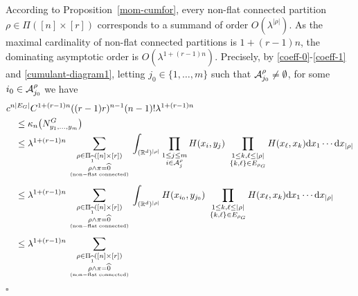 \documentclass[12pt]{article}
\newcommand{\R}{\mathbb{R}}
\newenvironment{Proof}{\removelastskip\par\medskip
\noindent{\em Proof.} \rm}{\penalty-20\null\hfill$\square$\par\medbreak}
\numberwithin{equation}{section}
\begin{document}
\begin{Proof}
 According to Proposition~\ref{mom-cumfor}, every non-flat connected partition $\rho\in\Pi ([n]\times[r])$ corresponds to a summand of order $O(\lambda^{|\rho|
})$. 
 As the maximal cardinality of non-flat connected partitions is
 $1+(r-1)n$,
 the dominating asymptotic order is $O(\lambda^{ 1+(r-1)n })$.
 Precisely, by \eqref{coeff-0}-\eqref{coeff-1} and 
 \eqref{cumulant-diagram1}, letting
 $j_0\in \{1,\ldots , m\}$ such that ${\cal A}^\rho_{j_0} \not= \emptyset$, 
 for some $i_0 \in {\cal A}^\rho_{j_0}$ we have 
\begin{align*} 
 & 
    c^{n|E_G|}
    C^{1+(r-1)n}
    ( (r-1)r )^{n-1}(n-1)!
    \lambda^{1+(r-1)n}
    \\
        & \quad \leq      \kappa_n\big(N_{y_1,\dots,y_m}^G\big)
  \\
   & \quad
    \leq     
    \lambda^{1+(r-1)n}
    \sum_{\substack{\rho\in\Pi_{\widehat{1}} ([n]\times[r])
        \\\rho\wedge\pi=\widehat{0}} \atop {\rm (non-flat \ \! connected) \atop
    }}
    \int_{(\R^d)^{|\rho|}}\prod_{
      \substack{%
        1 \leq j \leq m
      \\
    i\in {\cal A}^\rho_j}} H (x_i,y_j)
  \ \prod_{\substack{
      1\leq k , \ell \le|\rho|
      \\
      \{ k , \ell \}\in E_{\rho_G} }}H (x_\ell,x_k)\mathrm{d}x_1
  \cdots \mathrm{d}x_{|\rho|} 
  \\
   & \quad
    \leq     
    \lambda^{1+(r-1)n}
    \sum_{\substack{\rho\in\Pi_{\widehat{1}} ([n]\times[r])
        \\\rho\wedge\pi=\widehat{0}} \atop {\rm (non-flat \ \! connected) \atop
    }}
    \int_{(\R^d)^{|\rho|}}
     H (x_{i_0},y_{j_0})
  \ \prod_{\substack{
      1\leq k , \ell \le|\rho|
      \\
      \{ k , \ell \}\in E_{\rho_G} }}H (x_\ell,x_k)\mathrm{d}x_1
  \cdots \mathrm{d}x_{|\rho|} 
  \\
   & \quad
    \leq     
    \lambda^{1+(r-1)n}
    \sum_{\substack{\rho\in\Pi_{\widehat{1}} ([n]\times[r])
        \\\rho\wedge\pi=\widehat{0}} \atop {\rm (non-flat \ \! connected) \atop
}}
\end{align*}
\end{Proof}
\end{document}
